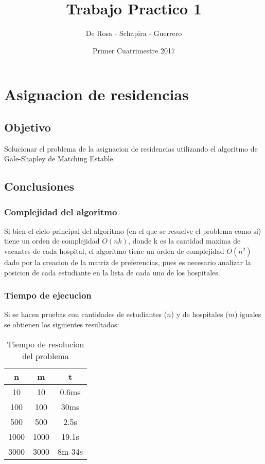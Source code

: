 \documentclass{article}
\title{Trabajo Practico 1}
\author{De Rosa - Schapira - Guerrero}
\date{Primer Cuatrimestre 2017}
\begin{document}
    \maketitle
    \newpage
    \tableofcontents
    \newpage

    \section{Asignacion de residencias}
        \subsection{Objetivo}
            Solucionar el problema de la asignacion de residencias utilizando
            el algoritmo de Gale-Shapley de Matching Estable.
        \subsection{Conclusiones}
            \subsubsection{Complejidad del algoritmo}
                Si bien el ciclo principal del algoritmo (en el que se resuelve el
                problema como si) tiene un orden de complejidad $O(nk)$, donde k
                es la cantidad maxima de vacantes de cada hospital, el algoritmo
                tiene un orden de complejidad $O(n^2)$ dado por la creacion de la
                matriz de preferencias, pues es necesario analizar la posicion de
                cada estudiante en la lista de cada uno de los hospitales.
            \subsubsection{Tiempo de ejecucion}
                Si se hacen pruebas con cantidades de estudiantes ($n$) y de hospitales
                ($m$) iguales se obtienen los siguientes resultados:
                \begin{table}[h!]
                    \centering
                    \caption{Tiempo de resolucion del problema}
                    \begin{tabular}{c|c|c}
                        n & m & t \\
                        \hline
                        10 & 10 & 0.6ms \\
                        \hline
                        100 & 100 & 30ms \\
                        \hline
                        500 & 500 & 2.5s \\
                        \hline
                        1000 & 1000 & 19.1s \\
                        \hline
                        3000 & 3000 & 8m 34s
                    \end{tabular}
                \end{table}
\end{document}
